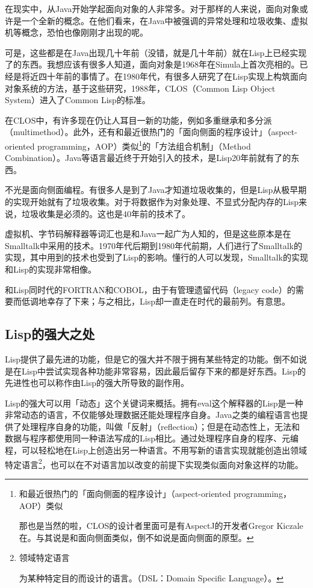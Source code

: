 \documentclass[a4paper,12pt]{article}
\begin{document}
在现实中，从Java开始学起面向对象的人非常多。对于那样的人来说，面向对象或许是一个全新的概念。在他们看来，在Java中被强调的异常处理和垃圾收集、虚拟机等概念，恐怕也像刚刚才出现的呢。

可是，这些都是在Java出现几十年前（没错，就是几十年前）就在Lisp上已经实现了的东西。我想应该有很多人知道，面向对象是1968年在Simula上首次亮相的。已经是将近四十年前的事情了。在1980年代，有很多人研究了在Lisp实现上构筑面向对象系统的方法，基于这些研究，1988年，CLOS（Common Lisp Object System）进入了Common Lisp的标准。

在CLOS中，有许多现在仍让人耳目一新的功能，例如多重继承和多分派（multimethod）。此外，还有和最近很热门的「面向侧面的程序设计」（aspect-oriented programming，AOP）类似\footnote{和最近很热门的「面向侧面的程序设计」（aspect-oriented programming，AOP）类似

那也是当然的啦，CLOS的设计者里面可是有AspectJ的开发者Gregor Kiczale在。与其说是和面向侧面类似，倒不如说是面向侧面的原型。}的「方法组合机制」（Method Combination）。Java等语言最近终于开始引入的技术，是Lisp20年前就有了的东西。

不光是面向侧面编程。有很多人是到了Java才知道垃圾收集的，但是Lisp从极早期的实现开始就有了垃圾收集。对于将数据作为对象处理、不显式分配内存的Lisp来说，垃圾收集是必须的。这也是40年前的技术了。

虚拟机、字节码解释器等词汇也是和Java一起广为人知的，但是这些原本是在Smalltalk中采用的技术。1970年代后期到1980年代前期，人们进行了Smalltalk的实现，其中用到的技术也受到了Lisp的影响。懂行的人可以发现，Smalltalk的实现和Lisp的实现非常相像。

和Lisp同时代的FORTRAN和COBOL，由于有管理遗留代码（legacy code）的需要而低调地幸存了下来；与之相比，Lisp却一直走在时代的最前列。有意思。

\subsection{Lisp的强大之处}

Lisp提供了最先进的功能，但是它的强大并不限于拥有某些特定的功能。倒不如说是在Lisp中尝试实现各种功能非常容易，因此最后留存下来的都是好东西。Lisp的先进性也可以称作由Lisp的强大所导致的副作用。

Lisp的强大可以用「动态」这个关键词来概括。拥有eval这个解释器的Lisp是一种非常动态的语言，不仅能够处理数据还能处理程序自身。Java之类的编程语言也提供了处理程序自身的功能，叫做「反射」（reflection）；但是在动态性上，无法和数据与程序都使用同一种语法写成的Lisp相比。通过处理程序自身的程序、元编程，可以轻松地在Lisp上创造出另一种语言。不用写新的语言实现就能创造出领域特定语言\footnote{领域特定语言

为某种特定目的而设计的语言。（DSL：Domain Specific Language）。}，也可以在不对语言加以改变的前提下实现类似面向对象这样的功能。
\end{document}
